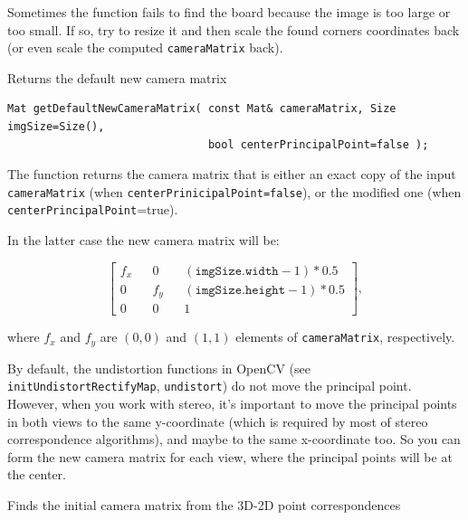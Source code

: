 Sometimes the function fails to find the board because the image is too large or too small. If so, try to resize it and then scale the found corners coordinates back (or even scale the computed \texttt{cameraMatrix} back).


\label{getDefaultNewCameraMatrix}
Returns the default new camera matrix

\begin{lstlisting}
Mat getDefaultNewCameraMatrix( const Mat& cameraMatrix, Size imgSize=Size(),
                               bool centerPrincipalPoint=false );
\end{lstlisting}
\begin{description}
\end{description}

The function returns the camera matrix that is either an exact copy of the input \texttt{cameraMatrix} (when \texttt{centerPrinicipalPoint=false}), or the modified one (when \texttt{centerPrincipalPoint}=true).

In the latter case the new camera matrix will be:

\[\begin{bmatrix}
f_x && 0 && (\texttt{imgSize.width}-1)*0.5 \\
0 && f_y && (\texttt{imgSize.height}-1)*0.5 \\
0 && 0 && 1
\end{bmatrix},\]

where $f_x$ and $f_y$ are $(0,0)$ and $(1,1)$ elements of \texttt{cameraMatrix}, respectively.

By default, the undistortion functions in OpenCV (see \texttt{initUndistortRectifyMap}, \texttt{undistort}) do not move the principal point. However, when you work with stereo, it's important to move the principal points in both views to the same y-coordinate (which is required by most of stereo correspondence algorithms), and maybe to the same x-coordinate too. So you can form the new camera matrix for each view, where the principal points will be at the center. 

\label{initCameraMatrix2D}
Finds the initial camera matrix from the 3D-2D point correspondences

